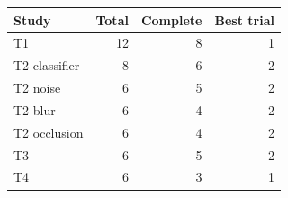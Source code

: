 \begin{tabular}{lrrr}\toprule Study & Total & Complete & Best trial\\\midrule
T1 & 12 & 8 & 1\\
T2 classifier & 8 & 6 & 2\\
T2 noise & 6 & 5 & 2\\
T2 blur & 6 & 4 & 2\\
T2 occlusion & 6 & 4 & 2\\
T3 & 6 & 5 & 2\\
T4 & 6 & 3 & 1\\
\bottomrule\end{tabular}